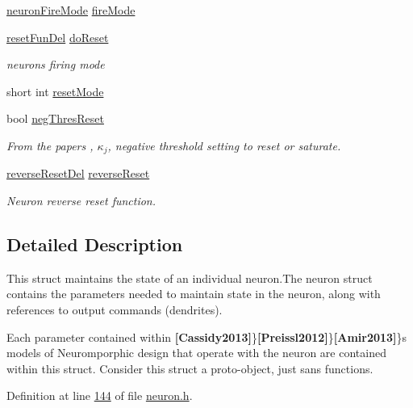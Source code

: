 {\bf }\par
\begin{DoxyCompactItemize}
\item 
\hyperlink{neuron_8h_a48885ea6be5b55a2e24de9f97552d4ee}{neuron\+Fire\+Mode} \hyperlink{structneuron_state_a55890f9e021064df30e9d18a9df98845}{fire\+Mode}
\item 
\hyperlink{neuron_8h_ae7e5990745cd949246894bfb633ca4a2}{reset\+Fun\+Del} \hyperlink{structneuron_state_afcf9d931e4fda519c43b4efeab687463}{do\+Reset}
\begin{DoxyCompactList}\small\item\em neuron\textquotesingle{}s firing mode \end{DoxyCompactList}\item 
short int \hyperlink{structneuron_state_af67bb650aa3150a6a31e16a874d71f91}{reset\+Mode}
\item 
bool \hyperlink{structneuron_state_a3ec480684e7a2cfc67a8ef7ac1bf57b9}{neg\+Thres\+Reset}
\begin{DoxyCompactList}\small\item\em From the paper\textquotesingle{}s , $𝜅_j$, negative threshold setting to reset or saturate. \end{DoxyCompactList}\item 
\hyperlink{neuron_8h_aa939c0acc5b3367975f2f0cb7bc36d17}{reverse\+Reset\+Del} \hyperlink{structneuron_state_abf6970098695585c81e101b2a741b9a5}{reverse\+Reset}
\begin{DoxyCompactList}\small\item\em Neuron reverse reset function. \end{DoxyCompactList}\end{DoxyCompactItemize}



\subsection{Detailed Description}
This struct maintains the state of an individual neuron.\+The neuron struct contains the parameters needed to maintain state in the neuron, along with references to output commands (dendrites). 

Each parameter contained within {\bfseries [Cassidy2013]}\}{\bfseries [Preissl2012]}\}{\bfseries [Amir2013]}\}\textquotesingle{}s models of Neuromporphic design that operate with the neuron are contained within this struct. Consider this struct a proto-\/object, just sans functions. 

Definition at line \hyperlink{neuron_8h_source_l00144}{144} of file \hyperlink{neuron_8h_source}{neuron.\+h}.



